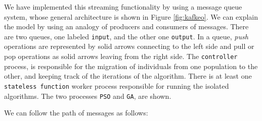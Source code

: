 \documentclass[runningheads]{llncs}
\begin{document}
We have implemented this streaming functionality by using a message queue
system, whose general architecture is shown in Figure \ref{fig:kafkeo}. We can explain
the model by using an analogy of producers and consumers of messages. There are
two queues, one labeled \texttt{input}, and the other one \texttt{output}. In a
queue, {\em push} operations are represented by solid arrows connecting to the
left side and pull or pop operations as solid arrows leaving from the right
side. The \texttt{controller} process, is responsible for the migration of
individuals from one population to the other, and keeping track of the
iterations of the algorithm. There is at least one \texttt{stateless function}
worker process responsible for running the isolated algorithms. The two
processes \texttt{PSO} and \texttt{GA}, are shown.

We can follow the path of messages as follows:
\end{document}
